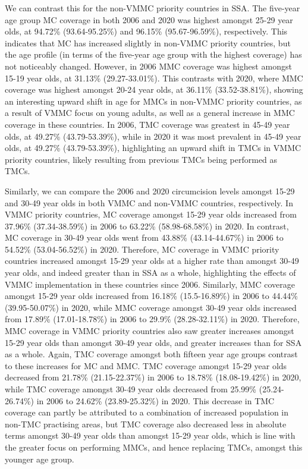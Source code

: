 \documentclass{article}
\begin{document}
We can contrast this for the non-VMMC priority countries in SSA. The
five-year age group MC coverage in both 2006 and 2020 was highest
amongst 25-29 year olds, at 94.72\% (93.64-95.25\%) and 96.15\%
(95.67-96.59\%), respectively. This indicates that MC has increased
slightly in non-VMMC priority countries, but the age profile (in terms
of the five-year age group with the highest coverage) has not noticeably
changed. However, in 2006 MMC coverage was highest amongst 15-19 year
olds, at 31.13\% (29.27-33.01\%). This contrasts with 2020, where MMC
coverage was highest amongst 20-24 year olds, at 36.11\%
(33.52-38.81\%), showing an interesting upward shift in age for MMCs in non-VMMC priority countries, as a result of VMMC focus on young adults, as well as a general increase in MMC coverage in these countries. In 2006, TMC coverage was greatest in 45-49 year olds, at 49.27\% (43.79-53.39\%), while in 2020 it was most prevalent in 45-49 year olds, at 49.27\% (43.79-53.39\%), highlighting an upward shift in TMCs in VMMC
priority countries, likely resulting from previous TMCs being
performed as TMCs.

Similarly, we can compare the 2006 and 2020 circumcision levels amongst 15-29 and 30-49 year olds in both VMMC and non-VMMC countries,
respectively. 
In VMMC priority countries, MC coverage amongst 15-29 year olds increased from 37.96\% (37.34-38.59\%) in 2006 to 63.22\% (58.98-68.58\%) in 2020. In contrast, MC coverage in 30-49 year olds went from 43.88\% (43.14-44.67\%) in 2006 to 54.52\% (53.04-56.52\%) in 2020. 
Therefore, MC coverage in VMMC priority countries increased
amongst 15-29 year olds at a higher rate than amongst 30-49 year olds, and indeed greater than in SSA as a whole, highlighting the effects of VMMC implementation in these countries since 2006. 
Similarly, MMC coverage amongst 15-29 year olds increased from 16.18\% (15.5-16.89\%) in 2006 to 44.44\% (39.95-50.07\%) in 2020, while MMC coverage amongst 30-49 year olds increased from 17.89\% (17.01-18.78\%) in 2006 to 29.9\% (28.28-32.11\%) in 2020. Therefore, MMC coverage in VMMC priority countries also saw greater increases amongst 15-29 year olds than amongst 30-49 year olds, and greater increases than for SSA as a whole.
Again, TMC coverage amongst both fifteen year age groups contrast to these increases for MC and MMC. TMC coverage amongst 15-29 year olds decreased from 21.78\% (21.15-22.37\%) in 2006 to 18.78\% (18.08-19.42\%) in 2020, while TMC coverage amongst 30-49 year olds decreased from 25.99\% (25.24-26.74\%) in 2006 to 24.62\% (23.89-25.32\%) in 2020. This decrease in TMC coverage can partly be attributed to a combination of increased population in non-TMC practising areas, but TMC coverage also decreased less in absolute terms amongst 30-49 year olds than amongst 15-29 year olds, which is line with the greater focus on performing MMCs, and hence replacing TMCs, amongst this younger age group.
\end{document}
